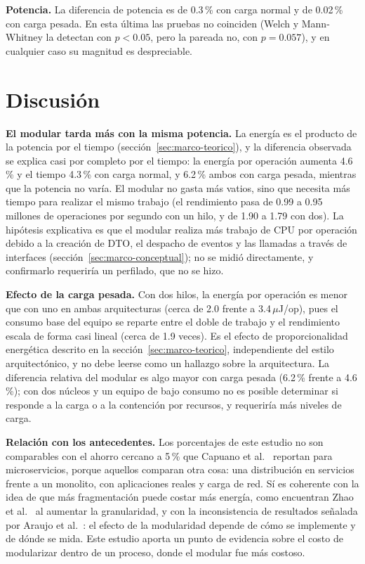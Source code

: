\textbf{Potencia.} La diferencia de potencia es de 0.3\,\% con carga normal y de 0.02\,\% con carga pesada. En esta última las pruebas no coinciden (Welch y Mann-Whitney la detectan con $p < 0.05$, pero la pareada no, con $p = 0.057$), y en cualquier caso su magnitud es despreciable.

\section{Discusión}

\textbf{El modular tarda más con la misma potencia.} La energía es el producto de la potencia por el tiempo (sección~\ref{sec:marco-teorico}), y la diferencia observada se explica casi por completo por el tiempo: la energía por operación aumenta 4.6\,\% y el tiempo 4.3\,\% con carga normal, y 6.2\,\% ambos con carga pesada, mientras que la potencia no varía. El modular no gasta más vatios, sino que necesita más tiempo para realizar el mismo trabajo (el rendimiento pasa de 0.99 a 0.95 millones de operaciones por segundo con un hilo, y de 1.90 a 1.79 con dos). La hipótesis explicativa es que el modular realiza más trabajo de CPU por operación debido a la creación de DTO, el despacho de eventos y las llamadas a través de interfaces (sección~\ref{sec:marco-conceptual}); no se midió directamente, y confirmarlo requeriría un perfilado, que no se hizo.

\textbf{Efecto de la carga pesada.} Con dos hilos, la energía por operación es menor que con uno en ambas arquitecturas (cerca de 2.0 frente a 3.4\,$\mu$J/op), pues el consumo base del equipo se reparte entre el doble de trabajo y el rendimiento escala de forma casi lineal (cerca de 1.9 veces). Es el efecto de proporcionalidad energética descrito en la sección~\ref{sec:marco-teorico}, independiente del estilo arquitectónico, y no debe leerse como un hallazgo sobre la arquitectura. La diferencia relativa del modular es algo mayor con carga pesada (6.2\,\% frente a 4.6\,\%); con dos núcleos y un equipo de bajo consumo no es posible determinar si responde a la carga o a la contención por recursos, y requeriría más niveles de carga.

\textbf{Relación con los antecedentes.} Los porcentajes de este estudio no son comparables con el ahorro cercano a 5\,\% que Capuano et al.~\cite{capuano2026comparative} reportan para microservicios, porque aquellos comparan otra cosa: una distribución en servicios frente a un monolito, con aplicaciones reales y carga de red. Sí es coherente con la idea de que más fragmentación puede costar más energía, como encuentran Zhao et al.~\cite{zhao2025granularity} al aumentar la granularidad, y con la inconsistencia de resultados señalada por Araujo et al.~\cite{araujo2024energy}: el efecto de la modularidad depende de cómo se implemente y de dónde se mida. Este estudio aporta un punto de evidencia sobre el costo de modularizar dentro de un proceso, donde el modular fue más costoso.

